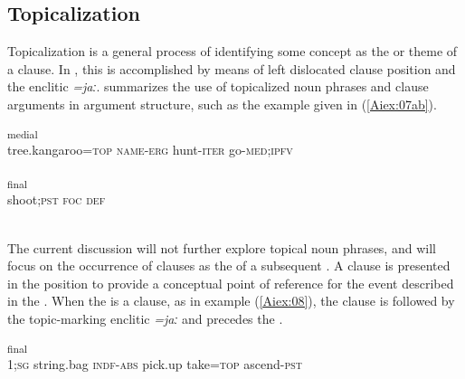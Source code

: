 \documentclass[output=paper]{LSP/langsci}
\begin{document}
\subsection{Topicalization} 
\label{AiTopicalization}
Topicalization is a general process of identifying some concept as the  or theme of a clause.
In , this is accomplished by means of left dislocated clause position and the enclitic \textit{=jaː}. \citet{Aiton.2014} summarizes the use of topicalized noun phrases and clause arguments in  argument
structure, such as the example given in (\ref{Aiex:07ab}).

\begin{exe}
\ex \label{Aiex:07ab}
\begin{xlist}
\ex \label{Aiex:07a}
\textsubscript{medial}\\
tree.kangaroo=\textsc{top}	\textsc{name}-\textsc{erg}	hunt-\textsc{iter}	go-\textsc{med};\textsc{ipfv}\\
\glt {}\\
\ex \label{Aiex:07b}
\textsubscript{final}\\
shoot;\textsc{pst}	\textsc{foc}	\textsc{def}\\
\glt {}\\
\end{xlist}
\end{exe}

The current discussion will not further explore topical noun phrases, and will focus on the occurrence of clauses as the  of a subsequent .
	A clause is presented in the  position to provide a conceptual point of reference for the event described in the . When the  is a clause, as in example (\ref{Aiex:08}), the clause is followed by the topic-marking enclitic \textit{=jaː} and precedes the .

\begin{exe}
\ex \label{Aiex:08}
\textsubscript{final}\\
1;\textsc{sg}	string.bag	\textsc{indf}-\textsc{abs}	pick.up	take=\textsc{top}	ascend-\textsc{pst}\\
\glt {}\\
\end{exe}
\end{document}

